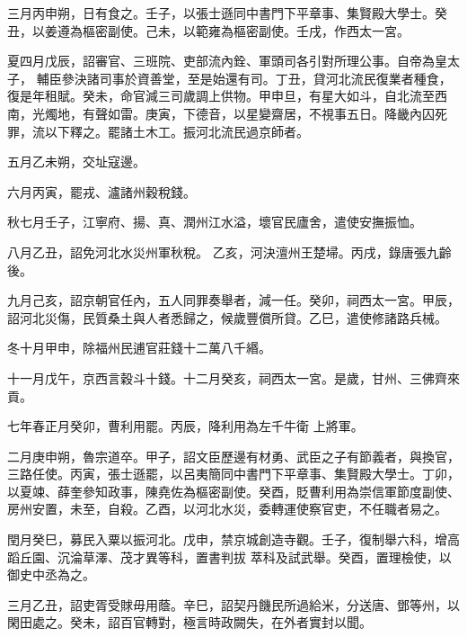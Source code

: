 \begin{pinyinscope}
 三月丙申朔，日有食之。壬子，以張士遜同中書門下平章事、集賢殿大學士。癸丑，以姜遵為樞密副使。己未，以範雍為樞密副使。壬戌，作西太一宮。



 夏四月戊辰，詔審官、三班院、吏部流內銓、軍頭司各引對所理公事。自帝為皇太子，
 輔臣參決諸司事於資善堂，至是始還有司。丁丑，貸河北流民復業者種食，復是年租賦。癸未，命官減三司歲調上供物。甲申旦，有星大如斗，自北流至西南，光燭地，有聲如雷。庚寅，下德音，以星變齋居，不視事五日。降畿內囚死罪，流以下釋之。罷諸土木工。振河北流民過京師者。



 五月乙未朔，交址寇邊。



 六月丙寅，罷戎、瀘諸州穀稅錢。



 秋七月壬子，江寧府、揚、真、潤州江水溢，壞官民廬舍，遣使安撫振恤。



 八月乙丑，詔免河北水災州軍秋稅。
 乙亥，河決澶州王楚埽。丙戌，錄唐張九齡後。



 九月己亥，詔京朝官任內，五人同罪奏舉者，減一任。癸卯，祠西太一宮。甲辰，詔河北災傷，民質桑土與人者悉歸之，候歲豐償所貸。乙巳，遣使修諸路兵械。



 冬十月甲申，除福州民逋官莊錢十二萬八千緡。



 十一月戊午，京西言穀斗十錢。十二月癸亥，祠西太一宮。是歲，甘州、三佛齊來貢。



 七年春正月癸卯，曹利用罷。丙辰，降利用為左千牛衛
 上將軍。



 二月庚申朔，魯宗道卒。甲子，詔文臣歷邊有材勇、武臣之子有節義者，與換官，三路任使。丙寅，張士遜罷，以呂夷簡同中書門下平章事、集賢殿大學士。丁卯，以夏竦、薛奎參知政事，陳堯佐為樞密副使。癸酉，貶曹利用為崇信軍節度副使、房州安置，未至，自殺。乙酉，以河北水災，委轉運使察官吏，不任職者易之。



 閏月癸巳，募民入粟以振河北。戊申，禁京城創造寺觀。壬子，復制舉六科，增高蹈丘園、沉淪草澤、茂才異等科，置書判拔
 萃科及試武舉。癸酉，置理檢使，以御史中丞為之。



 三月乙丑，詔吏胥受賕毋用蔭。辛巳，詔契丹饑民所過給米，分送唐、鄧等州，以閑田處之。癸未，詔百官轉對，極言時政闕失，在外者實封以聞。




\end{pinyinscope}

